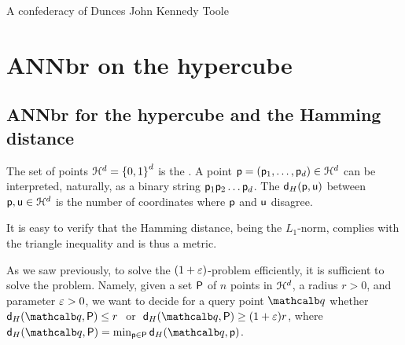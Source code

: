 %
%


%




\ChapterPrefix{}
\ChapterGen{}

%
{A confederacy of Dunces}%
{John Kennedy Toole}




\section{ANN{}br on the hypercube}

\subsection{ANN{}br for the hypercube and the Hamming distance}

\begin{defn}
    The set of points $\EuScript{H}^d = \left\{ {  0,1} \right\}^d$
    is the . A point
    $\mathsf{p} = (\mathsf{p}_1, \ldots, \mathsf{p}_d) \in \EuScript{H}^d$ can be
    interpreted, naturally, as a binary string
    $\mathsf{p}_1\mathsf{p}_2 \ldots \mathsf{p}_d$. The 
    $\distHY{\pnt}{\pntA}$ between $\mathsf{p}, \mathsf{u} \in \EuScript{H}^d$
    is the number of coordinates where $\mathsf{p}$ and $\mathsf{u}$ disagree.

    It is easy to verify that the Hamming distance, being the
    $L_1$-norm, complies with the triangle inequality and is thus a
    metric.
\end{defn}

As we saw previously, to solve the $(1+{\varepsilon})$-\ANNbr problem
efficiently, it is sufficient to solve the  problem. Namely, given a set ${\mathsf{P}}$ of $n$ points in
$\EuScript{H}^d$, a radius $r>0$, and parameter ${\varepsilon} >0$, we want
to decide for a query point $\query$ whether
$\distH{\query}{\PntSet} \leq r\;$ or
$\;\distH{\query}{\PntSet} \geq (1+\eps)r$, where
$\distH{\query}{\PntSet} = \min_{\pnt \in \PntSet}
\distH{\query}{\pnt}$.

